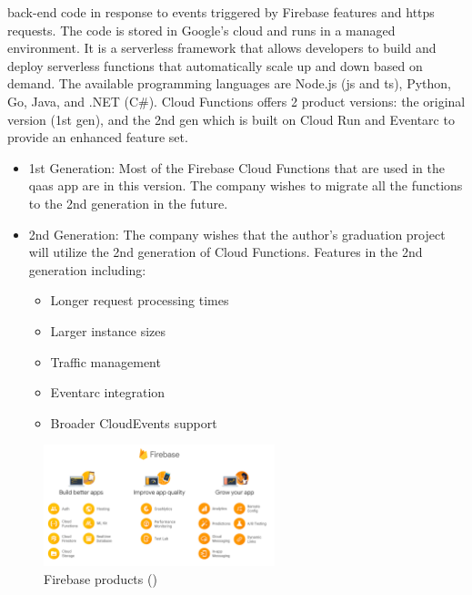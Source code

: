\begin{multicols}{2}
\begin{itemize}
                  back-end code in response to events triggered by Firebase features and \acrshort{https} requests.
                  The code is stored in Google's cloud and runs in a managed environment. It is a serverless framework
                  that allows developers to build and deploy serverless functions that automatically scale up and down
                  based on demand. The available programming languages are Node.js (\acrshort{js} and \acrshort{ts}),
                  Python, Go, Java, and .NET (C\#). Cloud Functions offers 2 product versions: the original version
                  (1st gen), and the 2nd gen which is built on Cloud Run and Eventarc to provide an enhanced feature set.
                  \begin{itemize}
                        \item 1st Generation: Most of the Firebase Cloud Functions that are used in the \acrshort{qaas} app
                              are in this version. The company wishes to migrate all the functions to the 2nd generation in
                              the future.
                        \item 2nd Generation: The company wishes that the author's graduation project will utilize the 2nd
                              generation of Cloud Functions. Features in the 2nd generation including:
                              \begin{itemize}
                                    \item Longer request processing times
                                    \item Larger instance sizes
                                    \item Traffic management
                                    \item Eventarc integration
                                    \item Broader CloudEvents support
                              \end{itemize}
                  \end{itemize}
      \end{itemize}
\end{multicols}


\begin{figure}[htbp]
      \centering
      \includegraphics[width=0.6\textwidth]{Figures/Firebase.png}
      \caption{Firebase products (\textit{\cite{firebasePic}})}
      \label{fig:tsjsvenn}
\end{figure}


